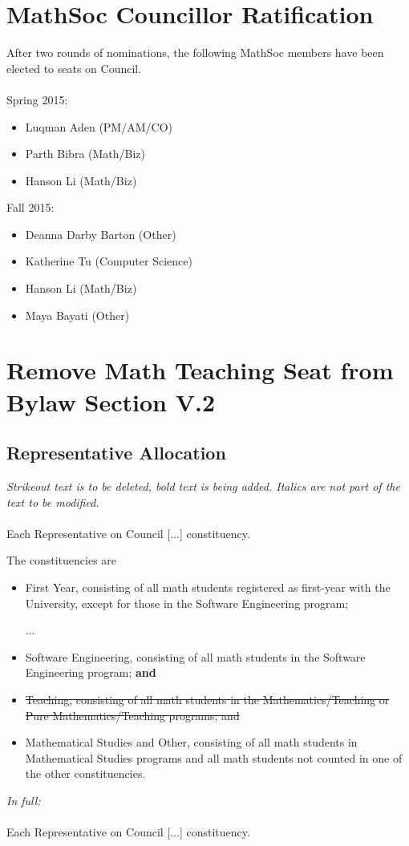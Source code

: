 \documentclass[12pt, letterpaper]{article}
\begin{document}
\newpage
{}
\section*{MathSoc Councillor Ratification}
After two rounds of nominations, the following MathSoc members have been elected to seats on Council.\\\\
Spring 2015:
\begin{itemize}
	\item Luqman Aden (PM/AM/CO)
	\item Parth Bibra (Math/Biz)
	\item Hanson Li (Math/Biz)
\end{itemize}
Fall 2015:
\begin{itemize}
	\item Deanna Darby Barton (Other)
	\item Katherine Tu (Computer Science)
	\item Hanson Li (Math/Biz)
	\item Maya Bayati (Other)
\end{itemize}

\newpage
{}
\section*{Remove Math Teaching Seat from Bylaw Section V.2}
\subsection*{Representative Allocation}
\textit{Strikeout text is to be deleted, bold text is being added. Italics are not part of the text to be modified.}\\\\
Each Representative on Council [...] constituency.

The constituencies are
\begin{itemize}
	\item First Year, consisting of all math students registered as first-year
	with the University, except for those in the Software Engineering program;
	\item [...]
	\item Software Engineering, consisting of all math students in the Software
	Engineering program; \textbf{and}
	\item \sout{Teaching, consisting of all math students in the
		Mathematics/Teaching or Pure Mathematics/Teaching programs;
		and}
	\item Mathematical Studies and Other, consisting of all math students in
	Mathematical Studies programs and all math students not counted in one of
	the other constituencies.
\end{itemize}
\emph{In full:}\\\\
Each Representative on Council [...] constituency.
\end{document}
